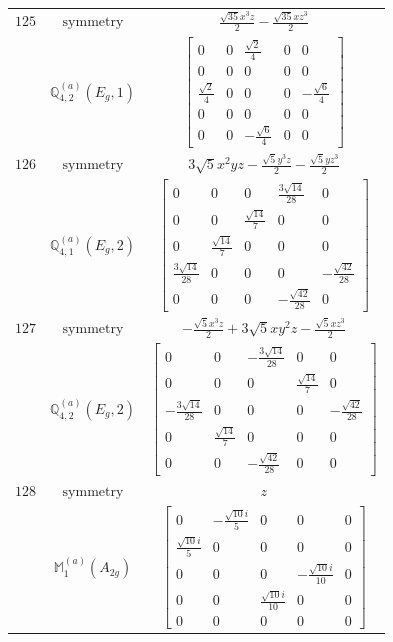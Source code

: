 \documentclass[fleqn,8pt,landscape]{jsarticle}
\begin{document}
\begin{longtable}{ccc}
$ 125 $ & $ \text{symmetry} $ & $ \frac{\sqrt{35} x^{3} z}{2} - \frac{\sqrt{35} x z^{3}}{2} $ \\
$  $ & $ \mathbb{Q}_{4,2}^{(a)}(E_{g},1) $ & $ \begin{bmatrix} 0 & 0 & \frac{\sqrt{2}}{4} & 0 & 0 \\ 0 & 0 & 0 & 0 & 0 \\ \frac{\sqrt{2}}{4} & 0 & 0 & 0 & - \frac{\sqrt{6}}{4} \\ 0 & 0 & 0 & 0 & 0 \\ 0 & 0 & - \frac{\sqrt{6}}{4} & 0 & 0 \end{bmatrix} $ \\ \hline
$ 126 $ & $ \text{symmetry} $ & $ 3 \sqrt{5} x^{2} y z - \frac{\sqrt{5} y^{3} z}{2} - \frac{\sqrt{5} y z^{3}}{2} $ \\
$  $ & $ \mathbb{Q}_{4,1}^{(a)}(E_{g},2) $ & $ \begin{bmatrix} 0 & 0 & 0 & \frac{3 \sqrt{14}}{28} & 0 \\ 0 & 0 & \frac{\sqrt{14}}{7} & 0 & 0 \\ 0 & \frac{\sqrt{14}}{7} & 0 & 0 & 0 \\ \frac{3 \sqrt{14}}{28} & 0 & 0 & 0 & - \frac{\sqrt{42}}{28} \\ 0 & 0 & 0 & - \frac{\sqrt{42}}{28} & 0 \end{bmatrix} $ \\ \hline
$ 127 $ & $ \text{symmetry} $ & $ - \frac{\sqrt{5} x^{3} z}{2} + 3 \sqrt{5} x y^{2} z - \frac{\sqrt{5} x z^{3}}{2} $ \\
$  $ & $ \mathbb{Q}_{4,2}^{(a)}(E_{g},2) $ & $ \begin{bmatrix} 0 & 0 & - \frac{3 \sqrt{14}}{28} & 0 & 0 \\ 0 & 0 & 0 & \frac{\sqrt{14}}{7} & 0 \\ - \frac{3 \sqrt{14}}{28} & 0 & 0 & 0 & - \frac{\sqrt{42}}{28} \\ 0 & \frac{\sqrt{14}}{7} & 0 & 0 & 0 \\ 0 & 0 & - \frac{\sqrt{42}}{28} & 0 & 0 \end{bmatrix} $ \\ \hline
$ 128 $ & $ \text{symmetry} $ & $ z $ \\
$  $ & $ \mathbb{M}_{1}^{(a)}(A_{2g}) $ & $ \begin{bmatrix} 0 & - \frac{\sqrt{10} i}{5} & 0 & 0 & 0 \\ \frac{\sqrt{10} i}{5} & 0 & 0 & 0 & 0 \\ 0 & 0 & 0 & - \frac{\sqrt{10} i}{10} & 0 \\ 0 & 0 & \frac{\sqrt{10} i}{10} & 0 & 0 \\ 0 & 0 & 0 & 0 & 0 \end{bmatrix} $ \\ \hline

\end{longtable}
\end{document}
